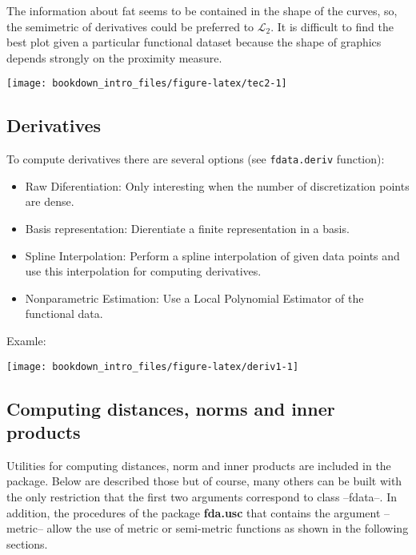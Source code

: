\documentclass[
]{book}
\providecommand{\tightlist}{%
  \setlength{\itemsep}{0pt}\setlength{\parskip}{0pt}}
\begin{document}
The information about fat seems to be contained in the shape of the curves, so, the semimetric of derivatives could be preferred to \(\mathcal{L}_2\). It is difficult to find the best plot given a particular functional dataset because the shape of graphics depends strongly on the proximity measure.

\begin{center}\texttt{[image: bookdown\_intro\_files/figure-latex/tec2-1]} \end{center}

\hypertarget{derivatives}{%
\subsection{Derivatives}\label{derivatives}}

To compute derivatives there are several options (see \texttt{fdata.deriv} function):

\begin{itemize}
\tightlist
\item
  Raw Diferentiation: Only interesting when the number of discretization points are dense.
\item
  Basis representation: Dierentiate a finite representation in a basis.
\item
  Spline Interpolation: Perform a spline interpolation of given data points and use this interpolation for computing derivatives.
\item
  Nonparametric Estimation: Use a Local Polynomial Estimator of the functional data.
\end{itemize}

Examle:

\begin{center}\texttt{[image: bookdown\_intro\_files/figure-latex/deriv1-1]} \end{center}

\hypertarget{computing-distances-norms-and-inner-products}{%
\subsection{Computing distances, norms and inner products}\label{computing-distances-norms-and-inner-products}}

Utilities for computing distances, norm and inner products are included in the package. Below are described those but of course, many others can be built with the only restriction that the first two arguments correspond to class --fdata--. In addition, the procedures of the package \textbf{fda.usc} that contains the argument --metric-- allow the use of metric or semi-metric functions as shown in the following sections.
\end{document}
